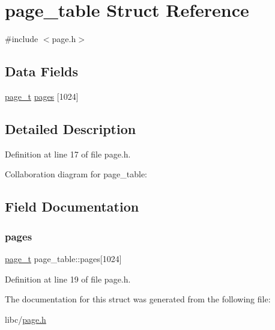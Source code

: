 \hypertarget{a00242}{}\section{page\+\_\+table Struct Reference}
\label{a00242}


{\ttfamily \#include $<$page.\+h$>$}

\subsection*{Data Fields}
\begin{DoxyCompactItemize}
\item 
\hyperlink{a00116_a76113662e059e0926a92c5b15c098f4a_a76113662e059e0926a92c5b15c098f4a}{page\+\_\+t} \hyperlink{a00242_a48867fe3c6d8599eff21b790260d55b4_a48867fe3c6d8599eff21b790260d55b4}{pages} \mbox{[}1024\mbox{]}
\end{DoxyCompactItemize}


\subsection{Detailed Description}


Definition at line 17 of file page.\+h.



Collaboration diagram for page\+\_\+table\+:


\subsection{Field Documentation}
\mbox{\label{a00242_a48867fe3c6d8599eff21b790260d55b4_a48867fe3c6d8599eff21b790260d55b4}} 
\subsubsection{\texorpdfstring{pages}{pages}}
{\footnotesize\ttfamily \hyperlink{a00116_a76113662e059e0926a92c5b15c098f4a_a76113662e059e0926a92c5b15c098f4a}{page\+\_\+t} page\+\_\+table\+::pages\mbox{[}1024\mbox{]}}



Definition at line 19 of file page.\+h.



The documentation for this struct was generated from the following file\+:\begin{DoxyCompactItemize}
\item 
libc/\hyperlink{a00116}{page.\+h}\end{DoxyCompactItemize}

